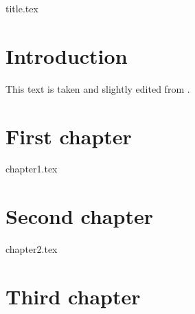\documentclass[a4paper,11pt]{book}
\begin{document}
\frontmatter
{title.tex}

\clearpage
\thispagestyle{empty}

\tableofcontents

\mainmatter

\chapter{Introduction}

This text is taken and slightly edited from \textcite{bielefeld}.

\chapter{First chapter}
{chapter1.tex}

\chapter{Second chapter}
{chapter2.tex}

\chapter{Third chapter}


\blackmatter

\printbibliography
\end{document}
